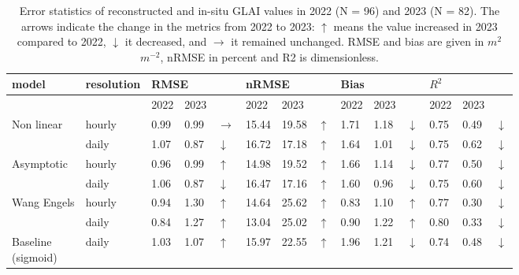 \begin{table}[H]
    \centering
    \caption{Error statistics of reconstructed and in-situ \gls{GLAI} values in 2022 (N = 96) and 2023 (N = 82). The arrows indicate the change in the metrics from 2022 to 2023: $\uparrow$ means the value increased in 2023 compared to 2022, $\downarrow$ it decreased, and $\rightarrow$ it remained unchanged. \gls{RMSE} and bias are given in $m^2$ $m^{-2}$, \gls{nRMSE} in percent and \gls{R2} is dimensionless.}
    \label{tab:error-stats-years}
\begin{tabular}{@{}llllllllllllll@{}}
\toprule
model                        & resolution & \multicolumn{3}{l}{RMSE} & \multicolumn{3}{l}{nRMSE} & \multicolumn{3}{l}{Bias} & \multicolumn{3}{l}{$R^2$} \\ \midrule
                             &            & 2022    & 2023     &             & 2022     & 2023     &            & 2022   & 2023   &             & 2022   & 2023   &     \\ \cmidrule(l){2-14} 
\multirow{2}{*}{Non linear}  & hourly     & 0.99  & 0.99  & $\rightarrow$ & 15.44  & 19.58  & $\uparrow$  & 1.71 & 1.18 & $\downarrow$ & 0.75 & 0.49 & $\downarrow$ \\
                             & daily      & 1.07  & 0.87  & $\downarrow$  & 16.72  & 17.18  & $\uparrow$  & 1.64 & 1.01 & $\downarrow$ & 0.75 & 0.62 & $\downarrow$ \\ \cmidrule(l){2-14} 
\multirow{2}{*}{Asymptotic}  & hourly     & 0.96  & 0.99  & $\uparrow$    & 14.98  & 19.52  & $\uparrow$  & 1.66 & 1.14 & $\downarrow$ & 0.77 & 0.50 & $\downarrow$  \\
                             & daily      & 1.06  & 0.87  & $\downarrow$  & 16.47  & 17.16  & $\uparrow$  & 1.60 & 0.96 & $\downarrow$ & 0.75 & 0.60 & $\downarrow$  \\ \cmidrule(l){2-14} 
\multirow{2}{*}{Wang Engels} & hourly     & 0.94  & 1.30  & $\uparrow$    & 14.64  & 25.62  & $\uparrow$  & 0.83 & 1.10 & $\uparrow$   & 0.77 & 0.30 & $\downarrow$  \\
                             & daily      & 0.84  & 1.27  & $\uparrow$    & 13.04  & 25.02  & $\uparrow$  & 0.90 & 1.22 & $\uparrow$   & 0.80 & 0.33 & $\downarrow$  \\ \cmidrule(l){2-14} 
\shortstack{Baseline\\(sigmoid)} & daily      & 1.03  & 1.07  & $\uparrow$    & 15.97  & 22.55  & $\uparrow$  & 1.96 & 1.21 & $\downarrow$ & 0.74 & 0.48 & $\downarrow$  \\ \bottomrule
\end{tabular}
\end{table}


